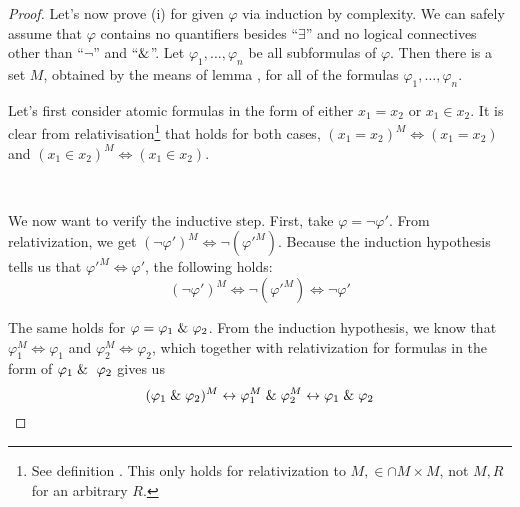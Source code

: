 \begin{proof}
Let's now prove (i) for given $\varphi$ via induction by complexity. We can safely assume that $\varphi$ contains no quantifiers besides ``$\exists$'' and no logical connectives other than ``$\neg$'' and ``$\mathrel{\&}$''.
Let $\varphi_1, \ldots, \varphi_n$ be all subformulas of $\varphi$. Then there is a set $M$, obtained by the means of lemma , for all of the formulas $\varphi_1, \ldots, \varphi_n$. 

Let's first consider atomic formulas in the form of either $x_1 = x_2$ or $x_1 \in x_2$. %
It is clear from relativisation\footnote{See definition . This only holds for relativization to $M, \in \cap M \times M$, not $M, R$ for an arbitrary $R$.} that  holds for both cases, $(x_1 = x_2)^M \iff (x_1 = x_2)$ and $(x_1 \in x_2)^M \iff (x_1 \in x_2)$.

\

We now want to verify the inductive step. First, take $\varphi = \neg \varphi'$. From relativization, we get $(\neg \varphi')^M \iff \neg (\varphi'^M)$.
Because the induction hypothesis tells us that $\varphi'^M \iff \varphi'$, the following holds:
\begin{equation}
(\neg \varphi')^{M} \iff \neg (\varphi'^M) \iff \neg \varphi'
\end{equation}

The same holds for $\varphi = \varphi_1 \mathrel{\&} \varphi_2$. From the induction hypothesis, we know that $\varphi_1^M \iff \varphi_1$ and $\varphi_2^M \iff \varphi_2$, which together with relativization for formulas in the form of $\varphi_1 \et \varphi_2$ gives us
\begin{equation}
(\varphi_1 \mathrel{\&} \varphi_2)^M \leftrightarrow \varphi_1^M \mathrel{\&} \varphi_2^M \leftrightarrow \varphi_1 \mathrel{\&} \varphi_2
\end{equation}


\end{proof}
